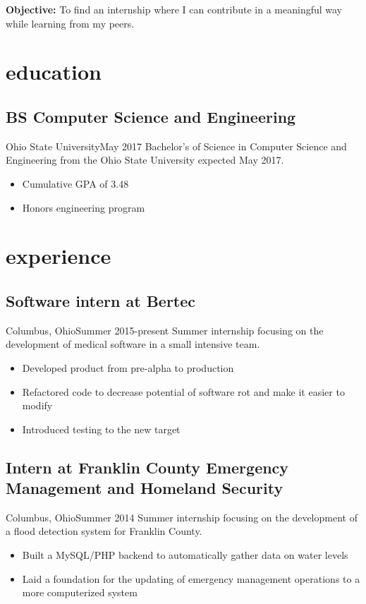 \documentclass[letterpaper,6pt]{cv}
\begin{document}
	\author{Brandon A. Moore}
	\address{PO Box 21161, Columbus OH 43221}
	\maketitle
	
	\noindent\textbf{\Large{Objective:}} To find an internship where I can contribute in a meaningful way while learning from my peers.

	\section{education}

	\subsection{BS Computer Science and Engineering}{Ohio State University}{May 2017}
			Bachelor's of Science in Computer Science and Engineering from the Ohio State University expected May 2017.
			\begin{itemize}
				\item Cumulative GPA of 3.48
				\item Honors engineering program
			\end{itemize}

	\section{experience}

	\subsection{Software intern at Bertec}{Columbus, Ohio}{Summer 2015-present}
			Summer internship focusing on the development of medical software in a small intensive team.
			\begin{itemize}
				\item Developed product from pre-alpha to production
				\item Refactored code to decrease potential of software rot and make it easier to modify
				\item Introduced testing to the new target
			\end{itemize}
	
		\subsection{Intern at Franklin County Emergency\\ Management and Homeland Security}{Columbus, Ohio}{Summer 2014}
			Summer internship focusing on the development of a flood detection system for Franklin County.
			\begin{itemize}
				\item Built a MySQL/PHP backend to automatically gather data on water levels
				\item Laid a foundation for the updating of emergency management operations to a more computerized system
			\end{itemize}
\end{document}
